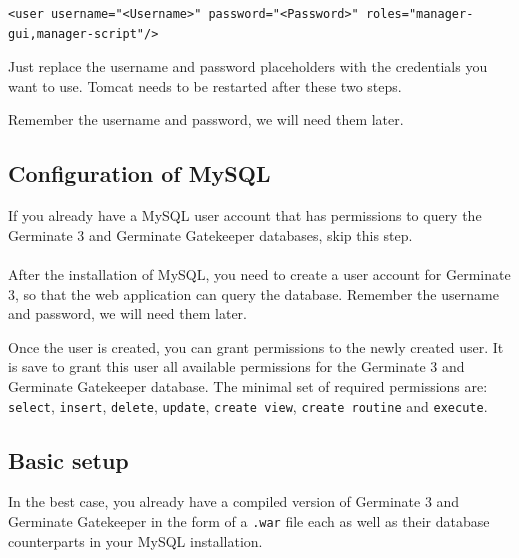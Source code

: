 \begin{lstlisting}[style=Xml]
<user username="<Username>" password="<Password>" roles="manager-gui,manager-script"/>
\end{lstlisting}
\noindent
Just replace the username and password placeholders with the credentials you want to use. Tomcat needs to be restarted after these two steps.

Remember the username and password, we will need them later.

\subsection{Configuration of MySQL}
\label{sec:mysql-basic}
If you already have a MySQL user account that has permissions to query the Germinate 3 and Germinate Gatekeeper databases, skip this step.\\
\\
After the installation of MySQL, you need to create a user account for Germinate 3, so that the web application can query the database.
Remember the username and password, we will need them later.

Once the user is created, you can grant permissions to the newly created user. It is save to grant this user all available permissions for the Germinate 3 and Germinate Gatekeeper database. The minimal set of required permissions are: \texttt{select}, \texttt{insert}, \texttt{delete}, \texttt{update}, \texttt{create view}, \texttt{create routine} and \texttt{execute}.

\subsection{Basic setup}
In the best case, you already have a compiled version of Germinate 3 and Germinate Gatekeeper in the form of a \texttt{.war} file each as well as their database counterparts in your MySQL installation. 

